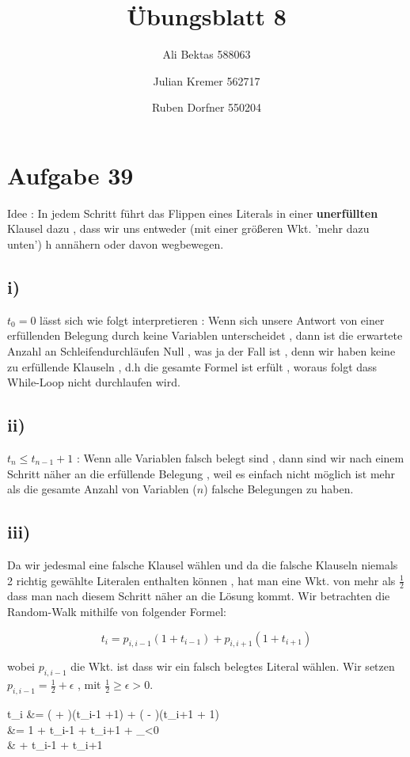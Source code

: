 \documentclass{article}
\title{Übungsblatt 8}
\author{Ali Bektas 588063 \and Julian Kremer 562717 \and Ruben Dorfner 550204}
\begin{document}
	\maketitle
	
	\section*{Aufgabe 39}
		Idee : In jedem Schritt führt das Flippen eines Literals in einer \textbf{unerfüllten} Klausel dazu , dass wir uns entweder (mit einer größeren Wkt. 'mehr dazu unten') h annähern oder davon wegbewegen.

		\subsection*{i)}
			$t_0 = 0 $ lässt sich wie folgt interpretieren : Wenn sich unsere Antwort von einer erfüllenden Belegung durch keine Variablen unterscheidet , dann ist die erwartete Anzahl an Schleifendurchläufen Null , was ja der Fall ist , denn wir haben keine zu erfüllende Klauseln , d.h die gesamte Formel ist erfült , woraus folgt dass While-Loop nicht durchlaufen wird.

		\subsection*{ii)}
			$t_n \leq t_{n-1} + 1$ : Wenn alle Variablen falsch belegt sind , dann sind wir nach einem Schritt näher an die erfüllende Belegung , weil es einfach nicht möglich ist mehr als die gesamte Anzahl von Variablen ($n$) falsche Belegungen zu haben.

		\subsection*{iii)}
			Da wir jedesmal eine falsche Klausel wählen und da die falsche Klauseln niemals 2 richtig gewählte Literalen enthalten können , hat man eine Wkt. von mehr als $\frac{1}{2}$ dass man nach diesem Schritt näher an die Lösung kommt. Wir betrachten die Random-Walk mithilfe von folgender Formel:

				\[ t_i = p_{i,i-1}(1+t_{i-1}) + p_{i,i+1}(1+t_{i+1}) \]


			wobei $p_{i,i-1}$ die Wkt. ist dass wir ein falsch belegtes Literal wählen. Wir setzen $p_{i,i-1} = \frac{1}{2} + \epsilon $ , mit $ \frac{1}{2} \geq \epsilon > 0 $.

			\begin{flalign*}
				t_i &= ( + \epsilon )(t_{i-1} +1) + ( - \epsilon)(t_{i+1} + 1)\\
				&= 1 + \frac{1}{2}t_{i-1} +  t_{i+1} + _{<0}\\ 
				& + \frac{1}{2}t_{i-1} +  t_{i+1}
			\end{flalign*} 
\end{document}
